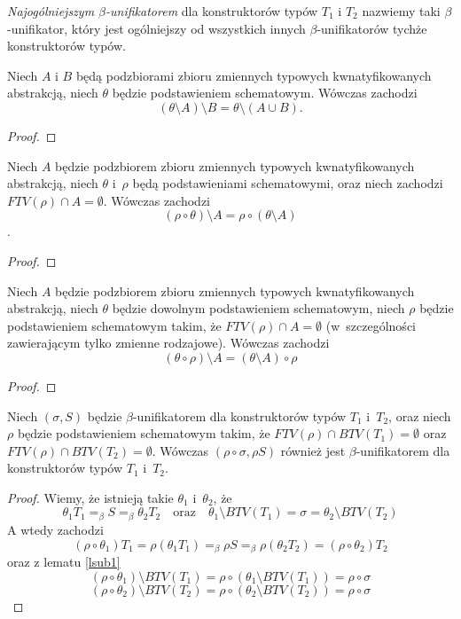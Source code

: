 \documentclass[11pt,leqno]{article}
\begin{document}
\begin{definicja}
\emph{Najogólniejszym $\beta$-unifikatorem} dla konstruktorów typów $T_1$ i $T_2$ nazwiemy taki $\beta$-unifikator,
który jest ogólniejszy od wszystkich innych $\beta$-unifikatorów tychże konstruktorów typów.
\end{definicja}

\begin{lemat}
Niech $A$ i $B$ będą podzbiorami zbioru zmiennych typowych kwnatyfikowanych abstrakcją, niech $\theta$ będzie podstawieniem schematowym.
Wówczas zachodzi
\[
(\theta \setminus A) \setminus B = \theta \setminus (A \cup B).
\]
\label{lsub0}
\end{lemat}
\begin{proof}
\end{proof}

\begin{lemat}
Niech $A$ będzie podzbiorem zbioru zmiennych typowych kwnatyfikowanych abstrakcją, niech $\theta$ i~$\rho$ będą podstawieniami schematowymi, oraz
niech zachodzi $FTV(\rho) \cap A = \emptyset$. Wówczas zachodzi 
\[
(\rho \circ \theta) \setminus A = \rho \circ (\theta \setminus A)
\].
\label{lsub1}
\end{lemat}
\begin{proof}
\end{proof}

\begin{lemat}
Niech $A$ będzie podzbiorem zbioru zmiennych typowych kwnatyfikowanych abstrakcją, niech $\theta$ będzie dowolnym podstawieniem schematowym,
niech $\rho$ będzie podstawieniem schematowym takim, że $FTV(\rho) \cap A = \emptyset$ (w~szczególności zawierającym tylko zmienne rodzajowe). 
Wówczas zachodzi
\[
(\theta \circ \rho) \setminus A = (\theta \setminus A) \circ \rho
\]
\label{lsub2}
\end{lemat}
\begin{proof}
\end{proof}

\begin{lemat}
Niech $(\sigma, S)$ będzie $\beta$-unifikatorem dla konstruktorów typów $T_1$ i~$T_2$, oraz niech $\rho$ będzie 
podstawieniem schematowym takim, że \mbox{$FTV(\rho) \cap BTV(T_1) = \emptyset$} oraz \mbox{$FTV(\rho) \cap BTV(T_2) = \emptyset$}.
Wówczas $(\rho \circ \sigma, \rho S)$ również jest $\beta$-unifikatorem dla konstruktorów typów $T_1$ i~$T_2$.
\label{lunif1}
\end{lemat}
\begin{proof}
Wiemy, że istnieją takie $\theta_1$ i~$\theta_2$, że
\[
\theta_1 T_1 =_\beta S =_\beta \theta_2 T_2 \quad \textrm{oraz} \quad \theta_1 \setminus BTV(T_1) = \sigma = \theta_2 \setminus BTV(T_2)
\]
A wtedy zachodzi
\[
(\rho \circ \theta_1)T_1 = \rho(\theta_1 T_1) =_\beta \rho S =_\beta \rho(\theta_2 T_2) = (\rho \circ \theta_2)T_2
\]
oraz z lematu \ref{lsub1}
\[
(\rho \circ \theta_1) \setminus BTV(T_1) = \rho \circ (\theta_1 \setminus BTV(T_1)) = \rho \circ \sigma
\]
\[
(\rho \circ \theta_2) \setminus BTV(T_2) = \rho \circ (\theta_2 \setminus BTV(T_2)) = \rho \circ \sigma
\]
\end{proof}
\end{document}
